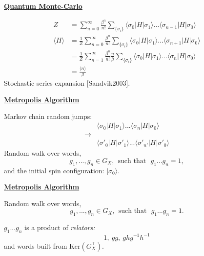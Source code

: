 \documentclass[11pt]{article}
\def\heading #1{\centerline{\underline{\bf\LARGE #1}}}
\def\vsp {\vspace*{0.5cm}}
\def\ket #1{|#1\rangle}
\def\bra #1{\langle #1|}
\begin{document}
\heading{Quantum Monte-Carlo}


\begin{align*}
    Z &= \sum_{n=0}^{\infty} \frac{\beta^n}{n!}
        \sum_{\{\sigma_i\}} 
            \bra{\sigma_0} H \ket{\sigma_1} ...
            \bra{\sigma_{n-1}} H \ket{\sigma_0} \\
    \langle H \rangle &= \frac{1}{Z} 
        \sum_{n=0}^{\infty} \frac{\beta^n}{n!}
        \sum_{\{\sigma_i\}} 
            \bra{\sigma_0} H \ket{\sigma_1} ...
            \bra{\sigma_{n+1}} H \ket{\sigma_0} \\
        &= \frac{1}{Z} 
        \sum_{n=1}^{\infty} \frac{\beta^n}{n!}
        \frac{n}{\beta}
        \sum_{\{\sigma_i\}} 
            \bra{\sigma_0} H \ket{\sigma_1} ...
            \bra{\sigma_{n}} H \ket{\sigma_0} \\
        &= \frac{\langle n \rangle}{\beta}
\end{align*}
\vspace*{-0.4cm}
Stochastic series expansion [Sandvik2003].

\newpage %

\heading{Metropolis Algorithm}

Markov chain random jumps:
\begin{align*}
    &\bra{\sigma_0} H \ket{\sigma_1} ...  \bra{\sigma_{n}} H \ket{\sigma_0} \\
\longrightarrow &\\
    &\bra{\sigma'_0} H \ket{\sigma'_1} ...  \bra{\sigma'_{n'}} H \ket{\sigma'_0} 
\end{align*}
%
%
%
Random walk over words,
$$ g_1,...,g_n \in G_X,\ \ \mbox{such that}\ \ \ g_1...g_n = 1, $$
and the initial spin configuration: $\ket{\sigma_0}.$

\newpage %

\heading{Metropolis Algorithm}

\vsp
Random walk over words,
$$ g_1,...,g_n \in G_X,\ \ \mbox{such that}\ \ \ g_1...g_n = 1. $$

$g_1...g_n$ is a product of {\it relators:}
$$
    1,\  gg,\  ghg^{-1}h^{-1}
$$
and words built from $\mbox{Ker}(G_X^\top).$


\newpage %
\end{document}
